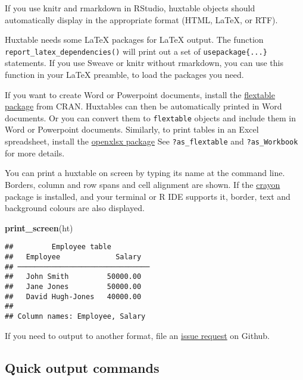 \documentclass[]{article}
\newenvironment{Shaded}{\begin{snugshade}}{\end{snugshade}}
\newcommand{\KeywordTok}[1]{\textcolor[rgb]{0.13,0.29,0.53}{\textbf{#1}}}
\newcommand{\NormalTok}[1]{#1}
\begin{document}
If you use knitr and rmarkdown in RStudio, huxtable objects should
automatically display in the appropriate format (HTML, LaTeX, or RTF).

Huxtable needs some LaTeX packages for LaTeX output. The function
\texttt{report\_latex\_dependencies()} will print out a set of
\texttt{usepackage\{...\}} statements. If you use Sweave or knitr
without rmarkdown, you can use this function in your LaTeX preamble, to
load the packages you need.

If you want to create Word or Powerpoint documents, install the
\href{https://cran.r-project.org/package=flextable}{flextable package}
from CRAN. Huxtables can then be automatically printed in Word
documents. Or you can convert them to \texttt{flextable} objects and
include them in Word or Powerpoint documents. Similarly, to print tables
in an Excel spreadsheet, install the
\href{https://cran.r-project.org/package=openxlsx}{openxlsx package} See
\texttt{?as\_flextable} and \texttt{?as\_Workbook} for more details.

You can print a huxtable on screen by typing its name at the command
line. Borders, column and row spans and cell alignment are shown. If the
\href{https://cran.r-project.org/package=crayon}{crayon} package is
installed, and your terminal or R IDE supports it, border, text and
background colours are also displayed.

\begin{Shaded}
\begin{Highlighting}[]
\KeywordTok{print_screen}\NormalTok{(ht)}
\end{Highlighting}
\end{Shaded}

\begin{verbatim}
##         Employee table         
##   Employee             Salary  
## ───────────────────────────────
##   John Smith         50000.00  
##   Jane Jones         50000.00  
##   David Hugh-Jones   40000.00  
## 
## Column names: Employee, Salary
\end{verbatim}

\FloatBarrier

If you need to output to another format, file an
\href{https://github.com/hughjonesd/huxtable}{issue request} on Github.

\hypertarget{quick-output-commands}{%
\subsection{Quick output commands}\label{quick-output-commands}}
\end{document}
